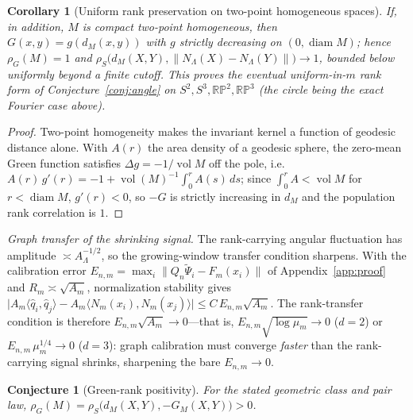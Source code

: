 \documentclass[11pt]{article}
\newtheorem{corollary}[theorem]{Corollary}
\newtheorem{conjecture}[theorem]{Conjecture}
\theoremstyle{remark}
\begin{document}
\begin{corollary}[Uniform rank preservation on two-point homogeneous spaces]\label{cor:two-point-rank}
If, in addition, $M$ is compact two-point homogeneous, then $G(x,y)=g(d_M(x,y))$ with
$g$ strictly decreasing on $(0,\operatorname{diam}M)$; hence $\rho_G(M)=1$ and
$\rho_S\bigl(d_M(X,Y),\lVert N_\Lambda(X)-N_\Lambda(Y)\rVert\bigr)\to1$, bounded below
uniformly beyond a finite cutoff. This proves the eventual uniform-in-$m$ rank form of
Conjecture~\ref{conj:angle} on $S^2,S^3,\mathbb{RP}^2,\mathbb{RP}^3$ (the circle being
the exact Fourier case above).
\end{corollary}

\begin{proof}
Two-point homogeneity makes the invariant kernel a function of geodesic distance alone.
With $A(r)$ the area density of a geodesic sphere, the zero-mean Green function satisfies
$\Delta g=-1/\operatorname{vol}M$ off the pole, i.e.\
$A(r)\,g'(r)=-1+\operatorname{vol}(M)^{-1}\int_0^r A(s)\,ds$; since
$\int_0^r A<\operatorname{vol}M$ for $r<\operatorname{diam}M$, $g'(r)<0$, so $-G$ is
strictly increasing in $d_M$ and the population rank correlation is $1$.
\end{proof}

\noindent\emph{Graph transfer of the shrinking signal.} The rank-carrying angular
fluctuation has amplitude $\asymp A_\Lambda^{-1/2}$, so the growing-window transfer
condition sharpens. With the calibration error
$E_{n,m}=\max_i\lVert Q_n\widetilde\Psi_i-F_m(x_i)\rVert$ of Appendix~\ref{app:proof} and
$R_m\asymp\sqrt{A_m}$, normalization stability gives
$\bigl\lvert A_m\langle\widehat q_i,\widehat q_j\rangle-A_m\langle N_m(x_i),N_m(x_j)\rangle\bigr\rvert
\le C\,E_{n,m}\sqrt{A_m}$. The rank-transfer condition is therefore
$E_{n,m}\sqrt{A_m}\to0$---that is, $E_{n,m}\sqrt{\log\mu_m}\to0$ ($d=2$) or
$E_{n,m}\,\mu_m^{1/4}\to0$ ($d=3$): graph calibration must converge \emph{faster} than
the rank-carrying signal shrinks, sharpening the bare $E_{n,m}\to0$.

\begin{conjecture}[Green-rank positivity]\label{conj:green-rank}
For the stated geometric class and pair law,
$\rho_G(M)=\rho_S\bigl(d_M(X,Y),-G_M(X,Y)\bigr)>0$.
\end{conjecture}
\end{document}
